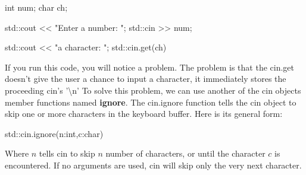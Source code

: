 \documentclass{report}
\begin{document}
    \begin{cppcode}
int num;
char ch;

std::cout << "Enter a number: ";
std::cin >> num;

std::cout << "\nEnter a character: ";
std::cin.get(ch)
    \end{cppcode}
    
    \bigbreak \noindent 
    If you run this code, you will notice a problem. The problem is that the cin.get doesn't give the user a chance to input a character, it immediately stores the proceeding cin's '\textbackslash n'
    \bigbreak \noindent 
    To solve this problem, we can use another of the cin objects member functions named \textbf{ignore}. The cin.ignore function tells the cin object to skip one or more characters in the keyboard buffer. Here is its general form:
    \smallbreak \noindent
    
    \begin{cppcode}
            std::cin.ignore(n:int,c:char)
    \end{cppcode}
    
    \bigbreak \noindent 
    Where $n$ tells cin to skip $n$ number of characters, or until the character $c$ is encountered. If no arguments are used, cin will skip only the very next character.
\end{document}

